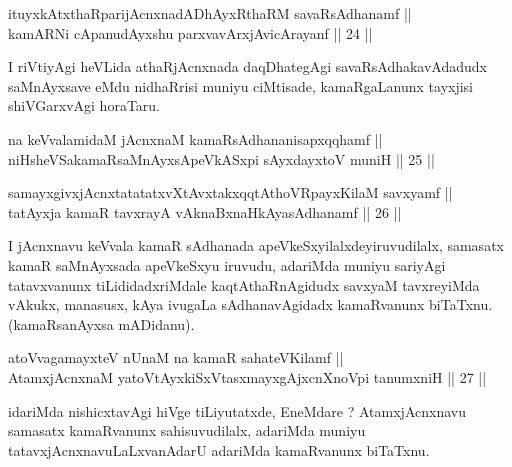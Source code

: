 
\begin{shl}
ituyxkAtxthaRparijAcnxnadADhAyxRthaRM savaRsAdhanamf || \\
kamARNi cApanudAyx\s \s shu parxvavArxjAvicArayanf ||  24 ||  
\end{shl}

\begin{artha}
I riVtiyAgi heVLida athaRjAcnxnada daqDhategAgi savaRsAdhakavAdadudx saMnAyxsave eMdu nidhaRrisi muniyu ciMtisade, kamaRgaLanunx tayxjisi shiVGarxvAgi horaTaru.
\end{artha}


\begin{shl}
na keVvalamidaM jAcnxnaM kamaRsAdhananisapxqqhamf || \\
niHsheVSakamaRsaMnAyxsApeVkASx\s pi sAyxdayxtoV muniH ||  25 || 
\end{shl}
				
\begin{shl}
samayxgivxjAcnxtatatatxvXtAvxtakxqqtAthoVR\s payxKilaM savxyamf || \\
tatAyxja kamaR tavxrayA vAknaBxnaHkAyasAdhanamf ||  26 ||  
\end{shl}

\begin{artha}
I jAcnxnavu keVvala kamaR sAdhanada apeVkeSxyilalxdeyiruvudilalx, samasatx kamaR saMnAyxsada apeVkeSxyu iruvudu, adariMda muniyu sariyAgi tatavxvanunx tiLididadxriMdale kaqtAthaRnAgidudx savxyaM tavxreyiMda vAkukx, manasusx, kAya ivugaLa sAdhanavAgidadx kamaRvanunx biTaTxnu. (kamaRsanAyxsa mADidanu).
\end{artha}


\begin{shl}
atoV\s vagamayxteV nUnaM na kamaR sahateV\s Kilamf || \\
AtamxjAcnxnaM yatoV\s tAyxkiSxVtasxmayxgAjxcnXnoV\s pi tanumxniH ||  27 ||  
\end{shl}

\begin{artha}
idariMda nishicxtavAgi hiVge tiLiyutatxde, EneMdare ? AtamxjAcnxnavu samasatx kamaRvanunx sahisuvudilalx, adariMda muniyu tatavxjAcnxnavuLaLxvanAdarU adariMda kamaRvanunx biTaTxnu.
\end{artha}


